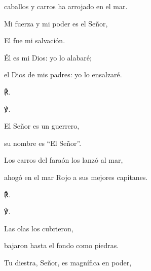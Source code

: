 			\begin{readtabbed}caballos y carros ha arrojado en el mar. \end{readtabbed}
			
			\begin{readtabbed}Mi fuerza y mi poder es el Señor, \end{readtabbed}
			
			\begin{readtabbed}El fue mi salvación. \end{readtabbed}
			
			\begin{readtabbed}Él es mi Dios: yo lo alabaré; \end{readtabbed}
			
			\begin{readtabbed}el Dios de mis padres: yo lo ensalzaré. \begin{readred}℟.\end{readred}\end{readtabbed}
			
			\begin{readbody}\begin{readred}℣.\end{readred} El Señor es un guerrero, \end{readbody}
			
			\begin{readtabbed}su nombre es “El Señor”. \end{readtabbed}
			
			\begin{readtabbed}Los carros del faraón los lanzó al mar, \end{readtabbed}
			
			\begin{readtabbed}ahogó en el mar Rojo a sus mejores capitanes. \begin{readred}℟.\end{readred}\end{readtabbed}
			
			\begin{readbody}\begin{readred}℣.\end{readred} Las olas los cubrieron, \end{readbody}
			
			\begin{readtabbed}bajaron hasta el fondo como piedras. \end{readtabbed}
			
			\begin{readtabbed}Tu diestra, Señor, es magnífica en poder, \end{readtabbed}
			
